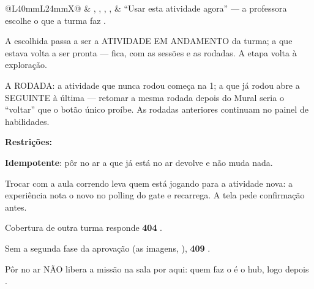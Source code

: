 \begin{tabularx}{\linewidth}{@{}L{40mm}L{24mm}X@{}}
 & , , , ,  & \enquote{Usar esta atividade agora} --- a professora escolhe o que a turma faz .\par A escolhida passa a ser a ATIVIDADE EM ANDAMENTO da turma; a que estava volta a ser pronta --- fica, com as sessões e as rodadas. A etapa volta à exploração.\par A RODADA: a atividade que nunca rodou começa na 1; a que já rodou abre a SEGUINTE à última --- retomar a mesma rodada depois do Mural seria o \enquote{voltar} que o botão único proíbe. As rodadas anteriores continuam no painel de habilidades.\par \textbf{Restrições:}\par \hspace*{1em}\textbullet{} \textbf{Idempotente}: pôr no ar a que já está no ar devolve  e não muda nada.\par \hspace*{1em}\textbullet{} Trocar com a aula correndo leva quem está jogando para a atividade nova: a experiência nota o  novo no polling do gate e recarrega. A tela pede confirmação antes.\par \hspace*{1em}\textbullet{} Cobertura de outra turma responde \textbf{404} .\par \hspace*{1em}\textbullet{} Sem a segunda fase da aprovação (as imagens, ), \textbf{409}  .\par \hspace*{1em}\textbullet{} Pôr no ar NÃO libera a missão na sala por aqui: quem faz o  é o hub, logo depois .\\

\end{tabularx}
